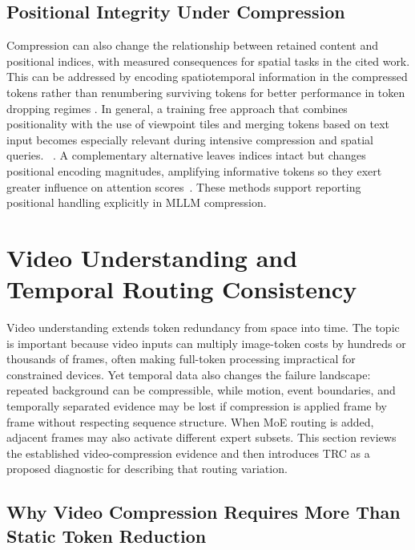 \documentclass[10pt]{article}
\begin{document}
\subsection{Positional Integrity Under Compression}
Compression can also change the relationship between retained content and positional
indices, with measured consequences for spatial tasks in the cited work.
This can be addressed by encoding spatiotemporal information in the compressed tokens
rather than renumbering surviving tokens for better performance in token dropping
regimes \citep{huang2026ppepositionalpreservationembedding}.  In general,
a training free approach that combines positionality with the use of viewpoint tiles and
merging tokens based on text input becomes especially relevant during intensive
compression and spatial queries.
~\citep{yu2026visiontrimunifiedvisiontoken}.  A complementary alternative leaves indices intact but changes
positional encoding magnitudes, amplifying informative tokens so they exert greater
influence on attention scores~\citep{huang2026modixtrainingfreemultimodalinformationdriven}.
These methods support reporting positional handling explicitly in MLLM compression.

\section{Video Understanding and Temporal Routing Consistency}
\label{sec:video}

Video understanding extends token redundancy from space into time.  The topic is
important because video inputs can multiply image-token costs by hundreds or thousands
of frames, often making full-token processing impractical for constrained devices.  Yet
temporal data also changes the failure landscape: repeated background can be
compressible, while motion, event boundaries, and temporally separated evidence may be
lost if compression is applied frame by frame without respecting sequence structure.
When MoE routing is added, adjacent frames may also activate different expert subsets.
This section reviews the established video-compression evidence and then introduces TRC
as a proposed diagnostic for describing that routing variation.

\subsection{Why Video Compression Requires More Than Static Token Reduction}
\end{document}
